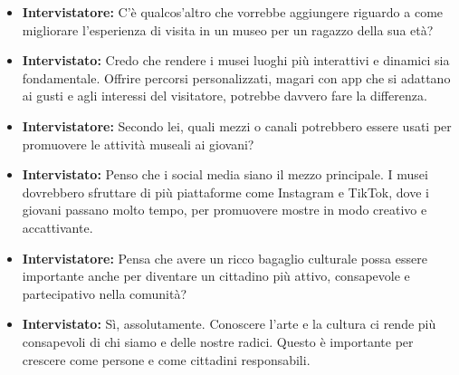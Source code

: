 \documentclass{article}
\begin{document}
\begin{itemize}
    \item \textbf{Intervistatore:} C'è qualcos’altro che vorrebbe aggiungere riguardo a come migliorare l’esperienza di visita in un museo per un ragazzo della sua età?
    \item \textbf{Intervistato:} Credo che rendere i musei luoghi più interattivi e dinamici sia fondamentale. Offrire percorsi personalizzati, magari con app che si adattano ai gusti e agli interessi del visitatore, potrebbe davvero fare la differenza.
    
    \item \textbf{Intervistatore:} Secondo lei, quali mezzi o canali potrebbero essere usati per promuovere le attività museali ai giovani?
    \item \textbf{Intervistato:} Penso che i social media siano il mezzo principale. I musei dovrebbero sfruttare di più piattaforme come Instagram e TikTok, dove i giovani passano molto tempo, per promuovere mostre in modo creativo e accattivante.
    
    \item \textbf{Intervistatore:} Pensa che avere un ricco bagaglio culturale possa essere importante anche per diventare un cittadino più attivo, consapevole e partecipativo nella comunità?
    \item \textbf{Intervistato:} Sì, assolutamente. Conoscere l'arte e la cultura ci rende più consapevoli di chi siamo e delle nostre radici. Questo è importante per crescere come persone e come cittadini responsabili.
    
\end{itemize}
\end{document}
